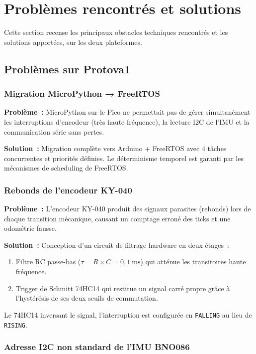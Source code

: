 \documentclass[a4paper,11pt]{article}
\begin{document}
\section{Problèmes rencontrés et solutions}

Cette section recense les principaux obstacles techniques rencontrés et les solutions
apportées, sur les deux plateformes.

\subsection{Problèmes sur Protova1}

\subsubsection{Migration MicroPython → FreeRTOS}

\textbf{Problème~:} MicroPython sur le Pico ne permettait pas de gérer simultanément
les interruptions d'encodeur (très haute fréquence), la lecture I2C de l'IMU et la
communication série sans pertes.

\textbf{Solution~:} Migration complète vers Arduino + FreeRTOS avec 4 tâches concurrentes
et priorités définies. Le déterminisme temporel est garanti par les mécanismes de
scheduling de FreeRTOS.

\subsubsection{Rebonds de l'encodeur KY-040}

\textbf{Problème~:} L'encodeur KY-040 produit des signaux parasites (rebonds) lors de
chaque transition mécanique, causant un comptage erroné des ticks et une odométrie
fausse.

\textbf{Solution~:} Conception d'un circuit de filtrage hardware en deux étages~:
\begin{enumerate}[noitemsep]
  \item Filtre RC passe-bas ($\tau = R \times C = 0{,}1\ \text{ms}$) qui atténue les
        transitoires haute fréquence.
  \item Trigger de Schmitt 74HC14 qui restitue un signal carré propre grâce à
        l'hystérésis de ses deux seuils de commutation.
\end{enumerate}
Le 74HC14 inversant le signal, l'interruption est configurée en \texttt{FALLING}
au lieu de \texttt{RISING}.

\subsubsection{Adresse I2C non standard de l'IMU BNO086}
\end{document}
